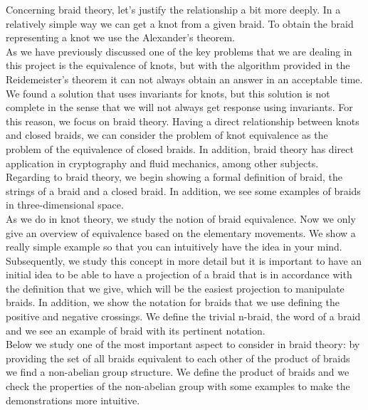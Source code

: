 Concerning braid theory, let's justify the relationship a bit more deeply. In a relatively simple way we can get a knot from a given braid. To obtain the braid representing a knot we use the Alexander's theorem.\\








As we have previously discussed one of the key problems that we are dealing in this project is the equivalence of knots, but with the algorithm provided in the Reidemeister's theorem it can not always obtain an answer in an acceptable time. We found a solution that uses invariants for knots, but this solution is not complete in the sense that we will not always get response using invariants. For this reason, we focus on braid theory. Having a direct relationship between knots and closed braids, we can consider the problem of knot equivalence as the problem of the equivalence of closed braids. In addition, braid theory has direct application in cryptography and fluid mechanics, among other subjects.\\








Regarding to braid theory, we begin showing a formal definition of braid, the strings of a braid and a closed braid. In addition, we see some examples of braids in three-dimensional space.\\


As we do in knot theory, we study the notion of braid equivalence. Now we only give an overview of equivalence based on the elementary movements. We show a really simple example so that you can intuitively have the idea in your mind. Subsequently, we study this concept in more detail but it is important to have an initial idea to be able to have a projection of a braid that is in accordance with the definition that we give, which will be the easiest projection to manipulate braids. In addition, we show the notation for braids that we use defining the positive and negative crossings. We define the trivial n-braid, the word of a braid and we see an example of braid with its pertinent notation.\\










Below we study one of the most important aspect to consider in braid theory: by providing the set of all braids equivalent to each other of the product of braids we find a non-abelian group structure. We define the product of braids and we check the properties of the non-abelian group with some examples to make the demonstrations more intuitive.\\

